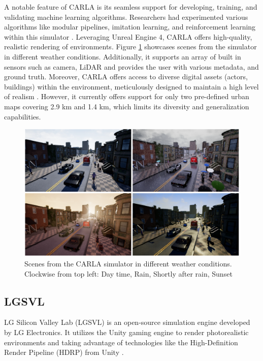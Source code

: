 \documentclass[12pt,twoside,a4paper,parskip]{scrbook} %
\begin{document}
A notable feature of CARLA is its seamless support for developing, training, and validating machine learning algorithms. Researchers had experimented various algorithms like modular pipelines, imitation learning, and reinforcement learning within this simulator \cite{Carla}. Leveraging Unreal Engine 4, CARLA offers high-quality, realistic rendering of environments. Figure \ref{fig:CARLA} \cite{Carla} showcases scenes from the simulator in different weather conditions. Additionally, it supports an array of built in sensors such as camera, LiDAR and provides the user with various metadata, and ground truth. Moreover, CARLA offers access to diverse digital assets (actors, buildings) within the environment, meticulously designed to maintain a high level of realism \cite{Carla}. However, it currently offers support for only two pre-defined urban maps covering 2.9 km and 1.4 km, which limits its diversity and generalization capabilities.

\begin{figure}[h]
    \centering
    \includegraphics[width=1.0\textwidth]{Images/CARLA_allweather.png}
    \caption[Scenes from the CARLA simulator in different weather conditions]{Scenes from the CARLA simulator in different weather conditions. Clockwise from top left: Day time, Rain, Shortly after rain, Sunset}
    \label{fig:CARLA}
  \end{figure}
\subsection{LGSVL}
LG Silicon Valley Lab (LGSVL) is an open-source simulation engine developed by LG Electronics. It utilizes the Unity gaming engine to render photorealistic environments and taking advantage of technologies like the High-Definition Render Pipeline (HDRP) from Unity \cite{unity}. 
\end{document}
